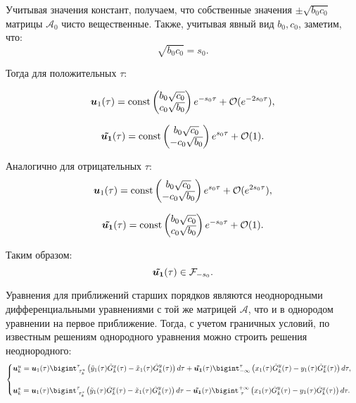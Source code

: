 Учитывая значения констант, получаем, что собственные значения $\pm \sqrt{b_0 c_0}$ матрицы $\mathcal{A}_0$ чисто вещественные. Также, учитывая явный вид $b_0,c_0$, заметим, что:
$$\sqrt{b_0 c_0} = s_0.$$

Тогда для положительных $\tau$:

$$\boldsymbol{u}_1(\tau) = \text{const} \begin{pmatrix} b_0 \sqrt{c_0} \\ c_0 \sqrt{b_0} \end{pmatrix} e^{-s_0 \tau} + \mathcal{O}(e^{-2s_0 \tau}),$$

$$\boldsymbol{ \tilde{u_1}}(\tau) = \text{const} \begin{pmatrix} b_0 \sqrt{c_0} \\ -c_0 \sqrt{b_0} \end{pmatrix} e^{s_0 \tau} + \mathcal{O}(1).$$

Аналогично для отрицательных $\tau$:
$$\boldsymbol{u}_1(\tau) = \text{const} \begin{pmatrix} b_0 \sqrt{c_0} \\ -c_0 \sqrt{b_0} \end{pmatrix} e^{s_0 \tau} + \mathcal{O}(e^{2s_0 \tau}),$$

$$\boldsymbol{ \tilde{u_1}}(\tau) = \text{const} \begin{pmatrix} b_0 \sqrt{c_0} \\ c_0 \sqrt{b_0} \end{pmatrix} e^{-s_0 \tau} + \mathcal{O}(1).$$

Таким образом:
$$\boldsymbol{ \tilde{u_1}}(\tau) \in \mathcal{F}_{-s_0}.$$

Уравнения для приближений старших порядков являются неоднородными дифференциальными уравнениями с той же матрицей $\mathcal{A}$, что и в однородом уравнении на первое приближение. Тогда, с учетом граничных условий, по известным решениям однородного уравнения можно строить решения неоднородного:
\begin{equation}
    \begin{cases}
        \v u_k^u = 
        \v u_1(\tau)\bigint_{\text{ } \tau^u_k}^\tau \left( \tilde y_1(\tau) \tilde G_k^x(\tau) - \tilde x_1(\tau) \tilde G_k^y(\tau) \right) d \tau + 
        \v{ \tilde{u_1}}(\tau) \bigint_{-\infty}^\tau \left( x_1(\tau) \tilde G_k^y(\tau) - y_1(\tau) \tilde G_k^x(\tau) \right) d \tau,\\
        \\
        
        \v u_k^s = 
        \v u_1(\tau)\bigint_{\text{ } \tau^s_k}^{\tau} \left( \tilde y_1(\tau) \tilde G_k^x(\tau) - \tilde x_1(\tau) \tilde G_k^y(\tau) \right) d \tau - 
        \v{ \tilde{u_1}}(\tau) \bigint_{\text{ } \tau}^{+\infty} \left( x_1(\tau) \tilde G_k^y(\tau) - y_1(\tau) \tilde G_k^x(\tau) \right) d \tau. \\
    \end{cases}
    \label{neodnor}
\end{equation}

